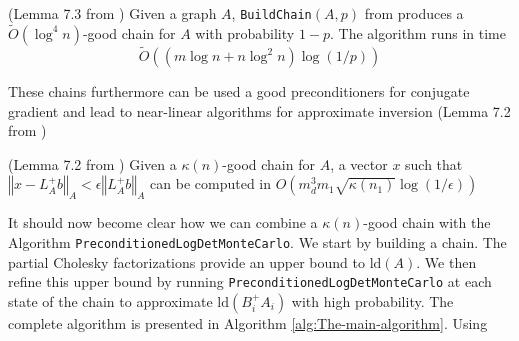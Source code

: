 \begin{lemma} \label{lem:good-chain} (Lemma 7.3 from \cite{Koutis2010})
Given a graph $A$, \texttt{BuildChain}$\left(A,p\right)$ from \cite{Koutis2010}
produces a $\tilde{O}\left(\log^{4}n\right)$-good chain for $A$
with probability $1-p$. The algorithm runs in time 
\[
\tilde{O}\left(\left(m\log n+n\log^{2}n\right)\log\left(1/p\right)\right)
\]


\end{lemma} These chains furthermore can be used a good preconditioners
for conjugate gradient and lead to near-linear algorithms for approximate
inversion (Lemma 7.2 from \cite{Koutis2010}) 

\begin{lemma} (Lemma 7.2 from \cite{Koutis2010}) Given a $\kappa\left(n\right)$-good
chain for $A$, a vector $x$ such that $\left\Vert x-L_{A}^{+}b\right\Vert _{A}<\epsilon\left\Vert L_{A}^{+}b\right\Vert _{A}$
can be computed in $O\left(m_{d}^{3}m_{1}\sqrt{\kappa\left(n_{1}\right)}\log\left(1/\epsilon\right)\right)$
\end{lemma}

It should now become clear how we can combine a $\kappa\left(n\right)$-good
chain with the Algorithm \texttt{PreconditionedLogDetMonteCarlo}.
We start by building a chain. The partial Cholesky factorizations
provide an upper bound to $\mbox{ld}\left(A\right)$. We then refine
this upper bound by running \texttt{PreconditionedLogDetMonteCarlo}
at each state of the chain to approximate $\mbox{ld}\left(B_{i}^{+}A_{i}\right)$
with high probability. The complete algorithm is presented in Algorithm
\ref{alg:The-main-algorithm}. Using 
